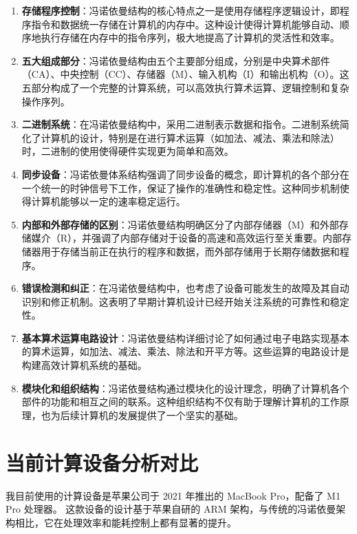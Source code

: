 \documentclass[12pt]{article} %
\theoremstyle{definition}
\begin{document}
\begin{enumerate}
  \item \textbf{存储程序控制}：冯诺依曼结构的核心特点之一是使用存储程序逻辑设计，即程序指令和数据统一存储在计算机的内存中。这种设计使得计算机能够自动、顺序地执行存储在内存中的指令序列，极大地提高了计算机的灵活性和效率。
  \item \textbf{五大组成部分}：冯诺依曼结构由五个主要部分组成，分别是中央算术部件（CA）、中央控制（CC）、存储器（M）、输入机构（I）和输出机构（O）。这五部分构成了一个完整的计算系统，可以高效执行算术运算、逻辑控制和复杂操作序列。
  \item \textbf{二进制系统}：在冯诺依曼结构中，采用二进制表示数据和指令。二进制系统简化了计算机的设计，特别是在进行算术运算（如加法、减法、乘法和除法）时，二进制的使用使得硬件实现更为简单和高效。
  \item \textbf{同步设备}：冯诺依曼体系结构强调了同步设备的概念，即计算机的各个部分在一个统一的时钟信号下工作，保证了操作的准确性和稳定性。这种同步机制使得计算机能够以一定的速率稳定运行。
  \item \textbf{内部和外部存储的区别}：冯诺依曼结构明确区分了内部存储器（M）和外部存储媒介（R），并强调了内部存储对于设备的高速和高效运行至关重要。内部存储器用于存储当前正在执行的程序和数据，而外部存储用于长期存储数据和程序。
  \item \textbf{错误检测和纠正}：在冯诺依曼结构中，也考虑了设备可能发生的故障及其自动识别和修正机制。这表明了早期计算机设计已经开始关注系统的可靠性和稳定性。
  \item \textbf{基本算术运算电路设计}：冯诺依曼结构详细讨论了如何通过电子电路实现基本的算术运算，如加法、减法、乘法、除法和开平方等。这些运算的电路设计是构建高效计算机系统的基础。
  \item \textbf{模块化和组织结构}：冯诺依曼结构通过模块化的设计理念，明确了计算机各个部件的功能和相互之间的联系。这种组织结构不仅有助于理解计算机的工作原理，也为后续计算机的发展提供了一个坚实的基础。
\end{enumerate}

\section{当前计算设备分析对比}

我目前使用的计算设备是苹果公司于 2021 年推出的 MacBook Pro\cite{MacBookPro2023}，配备了 M1 Pro 处理器。
这款设备的设计基于苹果自研的 ARM 架构，与传统的冯诺依曼架构相比，它在处理效率和能耗控制上都有显著的提升。
\end{document}
